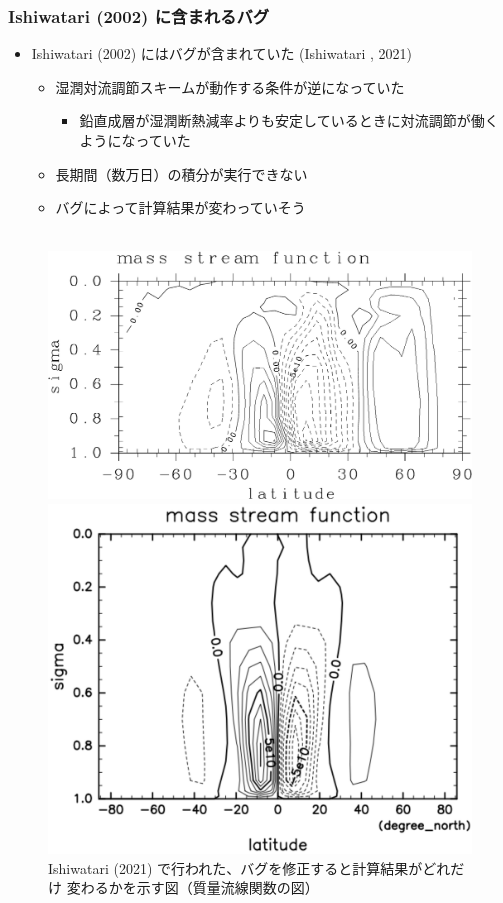 \documentclass[aspectratio=149,9pt,fleqn]{beamer}
\newcommand{\centeralign}[1]{\rule{0pt}{0pt}\hfill#1\hfill\rule{0pt}{0pt}}
\begin{document}
\begin{frame}
	\frametitle{Ishiwatari \etal (2002) に含まれるバグ}
	\begin{itemize}
		\item Ishiwatari \etal (2002) にはバグが含まれていた (Ishiwatari \etal*, 2021)
			\begin{itemize}
				\item 湿潤対流調節スキームが動作する条件が逆になっていた
					\begin{itemize}
						\item 鉛直成層が湿潤断熱減率よりも安定しているときに対流調節が働くようになっていた
					\end{itemize}
				\item 長期間（数万日）の積分が実行できない
				\item バグによって計算結果が変わっていそう
			\end{itemize}
	\end{itemize}
	\begin{figure}
		\centeralign{\hfill{}}\\
		\includegraphics[height=8\zh]{S1380-Strm-crop.pdf}
		\includegraphics[height=8\zh]{Fig4b_MSF_S1380.pdf}\\
		\scriptsize
		Ishiwatari \etal (2021) で行われた、バグを修正すると計算結果がどれだけ
		変わるかを示す図（質量流線関数の図）
	\end{figure}
\end{frame}
\end{document}
